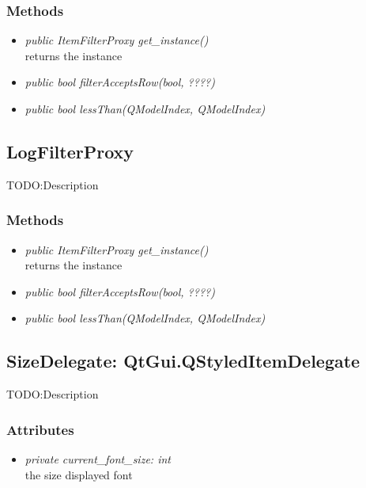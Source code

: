 \subsubsection{Methods}
\begin{itemize}
  
  \item \textit{public ItemFilterProxy get\_instance()}\\
  returns the instance
  \item \textit{public bool filterAcceptsRow(bool, ????)}\\
  
  \item \textit{public bool lessThan(QModelIndex, QModelIndex)}\\
  
\end{itemize}

\subsection{LogFilterProxy}
TODO:Description
\subsubsection{Methods}
\begin{itemize}
  
  \item \textit{public ItemFilterProxy get\_instance()}\\
  returns the instance
  \item \textit{public bool filterAcceptsRow(bool, ????)}\\
  
  \item \textit{public bool lessThan(QModelIndex, QModelIndex)}\\
  
\end{itemize}

\subsection{SizeDelegate: QtGui.QStyledItemDelegate}
TODO:Description
\subsubsection{Attributes}
\begin{itemize}
  \item \textit{private current\_font\_size: int}\\
  the size displayed font
\end{itemize}
